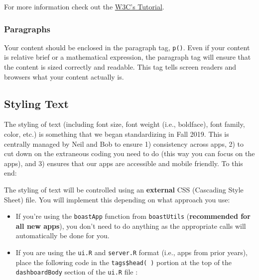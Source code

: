 \documentclass[
]{book}
\providecommand{\tightlist}{%
  \setlength{\itemsep}{0pt}\setlength{\parskip}{0pt}}
\begin{document}
For more information check out the \href{https://www.w3.org/WAI/tutorials/page-structure/headings/}{W3C's Tutorial}.

\hypertarget{paragraphs}{%
\subsubsection{Paragraphs}\label{paragraphs}}

Your content should be enclosed in the paragraph tag, \texttt{p()}. Even if your content is relative brief or a mathematical expression, the paragraph tag will ensure that the content is sized correctly and readable. This tag tells screen readers and browsers what your content actually is.

\hypertarget{textStyle}{%
\subsection{Styling Text}\label{textStyle}}

The styling of text (including font size, font weight (i.e., boldface), font family, color, etc.) is something that we began standardizing in Fall 2019. This is centrally managed by Neil and Bob to ensure 1) consistency across apps, 2) to cut down on the extraneous coding you need to do (this way you can focus on the apps), and 3) ensures that our apps are accessible and mobile friendly. To this end:

The styling of text will be controlled using an \textbf{external} CSS (Cascading Style Sheet) file. You will implement this depending on what approach you use:

\begin{itemize}
\tightlist
\item
  If you're using the \texttt{boastApp} function from \texttt{boastUtils} (\textbf{recommended for all new apps}), you don't need to do anything as the appropriate calls will automatically be done for you.
\item
  If you are using the \texttt{ui.R} and \texttt{server.R} format (i.e., apps from prior years), place the following code in the \texttt{tags\$head(\ )} portion at the top of the \texttt{dashboardBody} section of the \texttt{ui.R} file :
\end{itemize}
\end{document}
